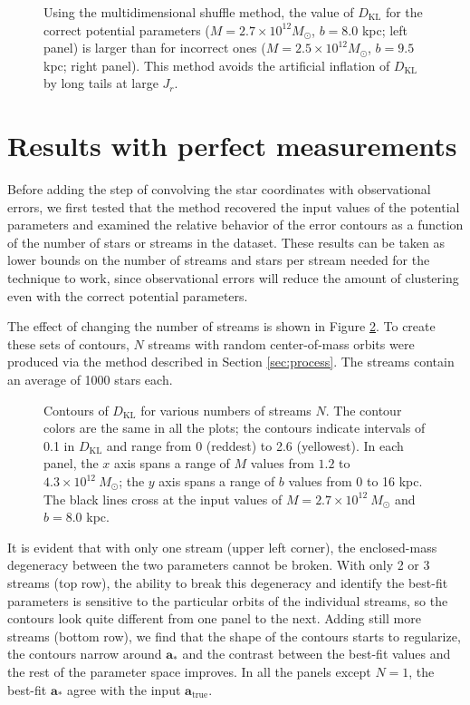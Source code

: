 \documentclass{emulateapj}
\newcommand{\sub}[2]{\ensuremath{#1_{\mathrm{#2}}}}
\begin{document}
\begin{figure}
\caption{Using the multidimensional shuffle method, the value of $\sub{D}{KL}$ for the correct potential parameters  ($M=2.7\times10^12 M_\odot$, $b=8.0$ kpc; left panel) is larger than for incorrect ones ($M=2.5\times10^12 M_\odot$, $b=9.5$ kpc; right panel). This method avoids the artificial inflation of $\sub{D}{KL}$ by long tails at large $J_r$.}
\label{fig:shuffL}
\end{figure}

\section{Results with perfect measurements}

Before adding the step of convolving the star coordinates with observational errors, we first tested that the method recovered the input values of the potential parameters and examined the relative behavior of the error contours as a function of the number of stars or streams in the dataset. These results can be taken as lower bounds on the number of streams and stars per stream needed for the technique to work, since observational errors will reduce the amount of clustering even with the correct potential parameters.

The effect of changing the number of streams is shown in Figure \ref{fig:HowManyStreams}. To create these sets of contours, $N$ streams with random center-of-mass orbits were produced via the method described in Section \ref{sec:process}. The streams contain an average of 1000 stars each. 

\begin{figure}
\caption{Contours of $\sub{D}{KL}$ for various numbers of streams $N$. The contour colors are the same in all the plots; the contours indicate intervals of 0.1 in $\sub{D}{KL}$ and range from 0 (reddest) to 2.6 (yellowest). In each panel, the $x$ axis spans a range of $M$ values from $1.2$ to $4.3 \times 10^{12}\ M_\odot$; the $y$ axis spans a range of $b$ values from 0 to 16 kpc. The black lines cross at the input values of $M = 2.7 \times 10^{12}\ M_\odot$ and $b = 8.0$ kpc.}
\label{fig:HowManyStreams}
\end{figure}

It is evident that with only one stream (upper left corner), the enclosed-mass degeneracy between the two parameters cannot be broken.  With only 2 or 3 streams (top row), the ability to break this degeneracy and identify the best-fit parameters is sensitive to the particular orbits of the individual streams, so the contours look quite different from one panel to the next. Adding still more streams (bottom row), we find that the shape of the contours starts to regularize, the contours narrow around $\mathbf{a}_*$ and the contrast between the best-fit values and the rest of the parameter space improves. In all the panels except $N=1$, the best-fit $\mathbf{a}_*$ agree with the input $\sub{\mathbf{a}}{true}$.
\end{document}
